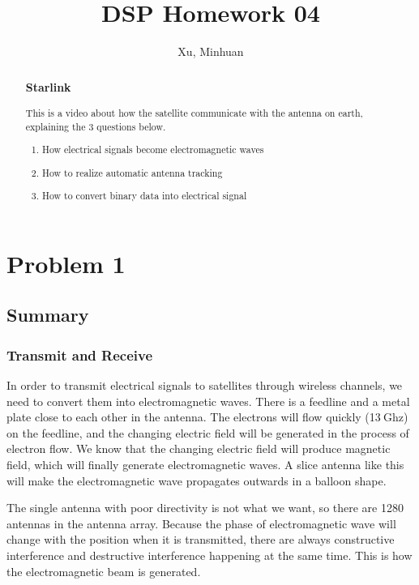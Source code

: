 \documentclass{article}
\begin{document}
\title{DSP Homework 04}
\author{Xu, Minhuan}
\maketitle
\tableofcontents
\begin{abstract}
\subsubsection*{Starlink}
This is a video about how the satellite communicate with the antenna on earth, explaining the 3 questions below.

\begin{enumerate}
    \item How electrical signals become electromagnetic waves
    \item How to realize automatic antenna tracking
    \item How to convert binary data into electrical signal
\end{enumerate}

\end{abstract}

\section{Problem 1}
\subsection{Summary}
\subsubsection{Transmit and Receive}
In order to transmit electrical signals to satellites through wireless channels, we need to convert them into electromagnetic waves. There is a feedline and a metal plate close to each other in the antenna. The electrons will flow quickly (13$~\mathrm{Ghz}$) on the feedline, and the changing electric field will be generated in the process of electron flow. We know that the changing electric field will produce magnetic field, which will finally generate electromagnetic waves. A slice antenna like this will make the electromagnetic wave propagates outwards in a balloon shape.

The single antenna with poor directivity is not what we want, so there are 1280 antennas in the antenna array. Because the phase of electromagnetic wave will change with the position when it is transmitted, there are always constructive interference and destructive interference happening at the same time. This is how the electromagnetic beam is generated.
\end{document}
